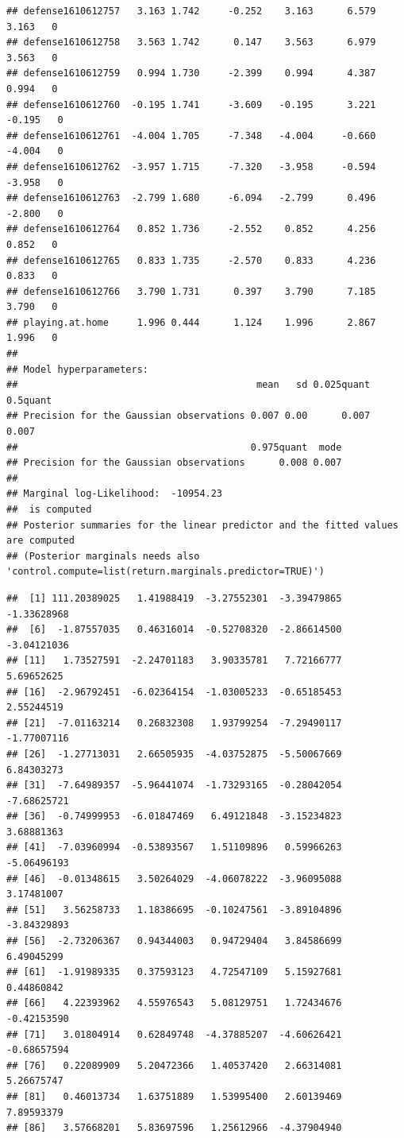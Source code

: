 \documentclass[
]{article}
\newenvironment{Shaded}{\begin{snugshade}}{\end{snugshade}}
\newcommand{\DocumentationTok}[1]{\textcolor[rgb]{0.56,0.35,0.01}{\textbf{\textit{#1}}}}
\newcommand{\NormalTok}[1]{#1}
\newcommand{\SpecialCharTok}[1]{\textcolor[rgb]{0.00,0.00,0.00}{#1}}
\newcommand{\StringTok}[1]{\textcolor[rgb]{0.31,0.60,0.02}{#1}}
\begin{document}
\begin{verbatim}
## defense1610612757   3.163 1.742     -0.252    3.163      6.579   3.163   0
## defense1610612758   3.563 1.742      0.147    3.563      6.979   3.563   0
## defense1610612759   0.994 1.730     -2.399    0.994      4.387   0.994   0
## defense1610612760  -0.195 1.741     -3.609   -0.195      3.221  -0.195   0
## defense1610612761  -4.004 1.705     -7.348   -4.004     -0.660  -4.004   0
## defense1610612762  -3.957 1.715     -7.320   -3.958     -0.594  -3.958   0
## defense1610612763  -2.799 1.680     -6.094   -2.799      0.496  -2.800   0
## defense1610612764   0.852 1.736     -2.552    0.852      4.256   0.852   0
## defense1610612765   0.833 1.735     -2.570    0.833      4.236   0.833   0
## defense1610612766   3.790 1.731      0.397    3.790      7.185   3.790   0
## playing.at.home     1.996 0.444      1.124    1.996      2.867   1.996   0
## 
## Model hyperparameters:
##                                          mean   sd 0.025quant 0.5quant
## Precision for the Gaussian observations 0.007 0.00      0.007    0.007
##                                         0.975quant  mode
## Precision for the Gaussian observations      0.008 0.007
## 
## Marginal log-Likelihood:  -10954.23 
##  is computed 
## Posterior summaries for the linear predictor and the fitted values are computed
## (Posterior marginals needs also 'control.compute=list(return.marginals.predictor=TRUE)')
\end{verbatim}

\begin{Shaded}
\end{Shaded}

\begin{verbatim}
##  [1] 111.20389025   1.41988419  -3.27552301  -3.39479865  -1.33628968
##  [6]  -1.87557035   0.46316014  -0.52708320  -2.86614500  -3.04121036
## [11]   1.73527591  -2.24701183   3.90335781   7.72166777   5.69652625
## [16]  -2.96792451  -6.02364154  -1.03005233  -0.65185453   2.55244519
## [21]  -7.01163214   0.26832308   1.93799254  -7.29490117  -1.77007116
## [26]  -1.27713031   2.66505935  -4.03752875  -5.50067669   6.84303273
## [31]  -7.64989357  -5.96441074  -1.73293165  -0.28042054  -7.68625721
## [36]  -0.74999953  -6.01847469   6.49121848  -3.15234823   3.68881363
## [41]  -7.03960994  -0.53893567   1.51109896   0.59966263  -5.06496193
## [46]  -0.01348615   3.50264029  -4.06078222  -3.96095088   3.17481007
## [51]   3.56258733   1.18386695  -0.10247561  -3.89104896  -3.84329893
## [56]  -2.73206367   0.94344003   0.94729404   3.84586699   6.49045299
## [61]  -1.91989335   0.37593123   4.72547109   5.15927681   0.44860842
## [66]   4.22393962   4.55976543   5.08129751   1.72434676  -0.42153590
## [71]   3.01804914   0.62849748  -4.37885207  -4.60626421  -0.68657594
## [76]   0.22089909   5.20472366   1.40537420   2.66314081   5.26675747
## [81]   0.46013734   1.63751889   1.53995400   2.60139469   7.89593379
## [86]   3.57668201   5.83697596   1.25612966  -4.37904940
\end{verbatim}
\end{document}

